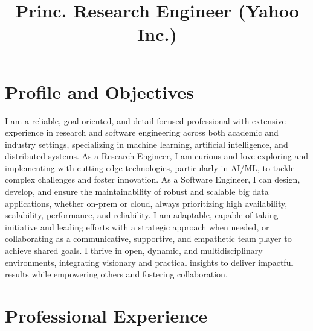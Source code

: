 \documentclass[10pt,a4paper,english]{moderncv}      %
\title{Princ. Research Engineer (Yahoo Inc.)}               %
\begin{document}
\maketitle
\vspace{0.1cm}

\section{Profile and Objectives}

\small I am a reliable, goal-oriented, and detail-focused professional with extensive experience in research and software engineering across both academic and industry settings, specializing in machine learning, artificial intelligence, and distributed systems. As a Research Engineer, I am curious and love exploring and implementing with cutting-edge technologies, particularly in AI/ML, to tackle complex challenges and foster innovation. As a Software Engineer, I can design, develop, and ensure the maintainability of robust and scalable big data applications, whether on-prem or cloud, always prioritizing high availability, scalability, performance, and reliability. I am adaptable, capable of taking initiative and leading efforts with a strategic approach when needed, or collaborating as a communicative, supportive, and empathetic team player to achieve shared goals. I thrive in open, dynamic, and multidisciplinary environments, integrating visionary and practical insights to deliver impactful results while empowering others and fostering collaboration.
\vspace{0.2cm}
\section{Professional Experience}


\end{document}
